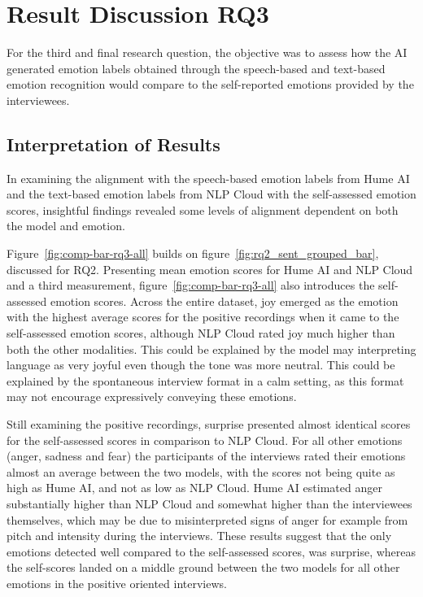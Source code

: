 
\section{Result Discussion RQ3}
For the third and final research question, the objective was to assess how the AI generated emotion labels obtained through the speech-based and text-based emotion recognition would compare to the self-reported emotions provided by the interviewees.

\subsection{Interpretation of Results}
In examining the alignment with the speech-based emotion labels from Hume AI and the text-based emotion labels from NLP Cloud with the self-assessed emotion scores, insightful findings revealed some levels of alignment dependent on both the model and emotion.

Figure~\ref{fig:comp-bar-rq3-all} builds on figure~\ref{fig:rq2_sent_grouped_bar}, discussed for RQ2. Presenting mean emotion scores for Hume AI and NLP Cloud and a third measurement, figure~\ref{fig:comp-bar-rq3-all} also introduces the self-assessed emotion scores.
Across the entire dataset, joy emerged as the emotion with the highest average scores for the positive recordings when it came to the self-assessed emotion scores, although NLP Cloud rated joy much higher than both the other modalities. This could be explained by the model may interpreting language as very joyful even though the tone was more neutral. This could be explained by the spontaneous interview format in a calm setting, as this format may not encourage expressively conveying these emotions.

Still examining the positive recordings, surprise presented almost identical scores for the self-assessed scores in comparison to NLP Cloud. For all other emotions (anger, sadness and fear) the participants of the interviews rated their emotions almost an average between the two models, with the scores not being quite as high as Hume AI, and not as low as NLP Cloud. Hume AI estimated anger substantially higher than NLP Cloud and somewhat higher than the interviewees themselves, which may be due to misinterpreted signs of anger for example from pitch and intensity during the interviews.
These results suggest that the only emotions detected well compared to the self-assessed scores, was surprise, whereas the self-scores landed on a middle ground between the two models for all other emotions in the positive oriented interviews.

